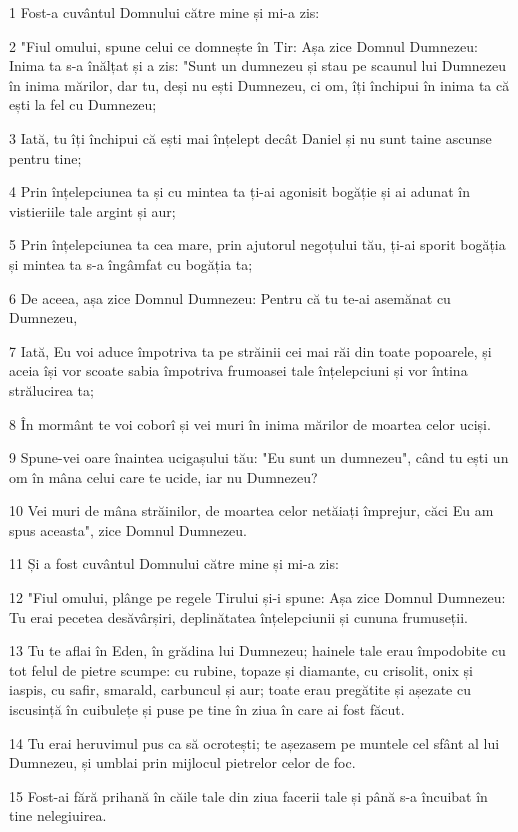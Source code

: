 \par 1 Fost-a cuvântul Domnului către mine și mi-a zis:
\par 2 "Fiul omului, spune celui ce domnește în Tir: Așa zice Domnul Dumnezeu: Inima ta s-a înălțat și a zis: "Sunt un dumnezeu și stau pe scaunul lui Dumnezeu în inima mărilor, dar tu, deși nu ești Dumnezeu, ci om, îți închipui în inima ta că ești la fel cu Dumnezeu;
\par 3 Iată, tu îți închipui că ești mai înțelept decât Daniel și nu sunt taine ascunse pentru tine;
\par 4 Prin înțelepciunea ta și cu mintea ta ți-ai agonisit bogăție și ai adunat în vistieriile tale argint și aur;
\par 5 Prin înțelepciunea ta cea mare, prin ajutorul negoțului tău, ți-ai sporit bogăția și mintea ta s-a îngâmfat cu bogăția ta;
\par 6 De aceea, așa zice Domnul Dumnezeu: Pentru că tu te-ai asemănat cu Dumnezeu,
\par 7 Iată, Eu voi aduce împotriva ta pe străinii cei mai răi din toate popoarele, și aceia își vor scoate sabia împotriva frumoasei tale înțelepciuni și vor întina strălucirea ta;
\par 8 În mormânt te voi coborî și vei muri în inima mărilor de moartea celor uciși.
\par 9 Spune-vei oare înaintea ucigașului tău: "Eu sunt un dumnezeu", când tu ești un om în mâna celui care te ucide, iar nu Dumnezeu?
\par 10 Vei muri de mâna străinilor, de moartea celor netăiați împrejur, căci Eu am spus aceasta", zice Domnul Dumnezeu.
\par 11 Și a fost cuvântul Domnului către mine și mi-a zis:
\par 12 "Fiul omului, plânge pe regele Tirului și-i spune: Așa zice Domnul Dumnezeu: Tu erai pecetea desăvârșiri, deplinătatea înțelepciunii și cununa frumuseții.
\par 13 Tu te aflai în Eden, în grădina lui Dumnezeu; hainele tale erau împodobite cu tot felul de pietre scumpe: cu rubine, topaze și diamante, cu crisolit, onix și iaspis, cu safir, smarald, carbuncul și aur; toate erau pregătite și așezate cu iscusință în cuibulețe și puse pe tine în ziua în care ai fost făcut.
\par 14 Tu erai heruvimul pus ca să ocrotești; te așezasem pe muntele cel sfânt al lui Dumnezeu, și umblai prin mijlocul pietrelor celor de foc.
\par 15 Fost-ai fără prihană în căile tale din ziua facerii tale și până s-a încuibat în tine nelegiuirea.
